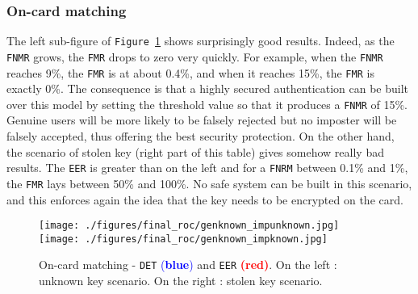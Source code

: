 \documentclass[a4paper,12pt]{article}
\begin{document}
\subsubsection{On-card matching}
The left sub-figure of \texttt{Figure \ref{final_roc}} shows surprisingly good results. Indeed, as the \texttt{FNMR} grows, the \texttt{FMR} drops to zero very quickly. For example, when the \texttt{FNMR} reaches 9\%, the \texttt{FMR} is at about 0.4\%, and when it reaches 15\%, the \texttt{FMR} is exactly 0\%. The consequence is that a highly secured authentication can be built over this model by setting the threshold value so that it produces a \texttt{FNMR} of 15\%. Genuine users will be more likely to be falsely rejected but no imposter will be falsely accepted, thus offering the best security protection. On the other hand, the scenario of stolen key (right part of this table) gives somehow really bad results. The \texttt{EER} is greater than on the left and for a \texttt{FNRM} between 0.1\% and 1\%, the \texttt{FMR} lays between 50\% and 100\%. No safe system can be built in this scenario, and this enforces again the idea that the key needs to be encrypted on the card.
\begin{figure}[!htbp]
\centering
\texttt{[image: ./figures/final\_roc/genknown\_impunknown.jpg]}
\texttt{[image: ./figures/final\_roc/genknown\_impknown.jpg]}\\
\caption{On-card matching - \texttt{DET} \textcolor{blue}{(\textbf{blue})} and \texttt{EER} \textcolor{red}{\textbf{(red)}}.
On the left : unknown key scenario.
On the right : stolen key scenario.}
\label{final_roc}
\end{figure}
\FloatBarrier
\end{document}
